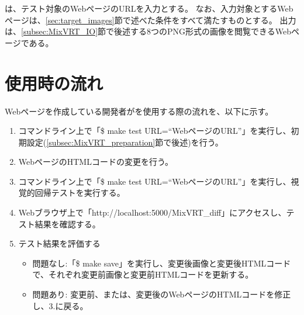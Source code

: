 
\toolName は、テスト対象のWebページのURLを入力とする。
なお、入力対象とするWebページは、\ref{sec:target_images}節で述べた条件をすべて満たすものとする。
出力は、\ref{subsec:MixVRT_IO}節で後述する8つのPNG形式の画像を閲覧できるWebページである。
\section{\toolName 使用時の流れ}
Webページを作成している開発者が\toolName を使用する際の流れを、以下に示す。
\begin{enumerate}
    \item コマンドライン上で「\$ make test URL=“WebページのURL”」を実行し、初期設定(\ref{subsec:MixVRT_preparation}節で後述)を行う。
    \item WebページのHTMLコードの変更を行う。
    \item コマンドライン上で「\$ make test URL=“WebページのURL”」を実行し、視覚的回帰テストを実行する。
    \item Webブラウザ上で「http://localhost:5000/MixVRT\_diff」にアクセスし、テスト結果を確認する。
    \item テスト結果を評価する
          \begin{itemize}
              \item 問題なし:「\$ make save」を実行し、変更後画像と変更後HTMLコードで、それぞれ変更前画像と変更前HTMLコードを更新する。
              \item 問題あり: 変更前、または、変更後のWebページのHTMLコードを修正し、3.に戻る。
          \end{itemize}
\end{enumerate}



